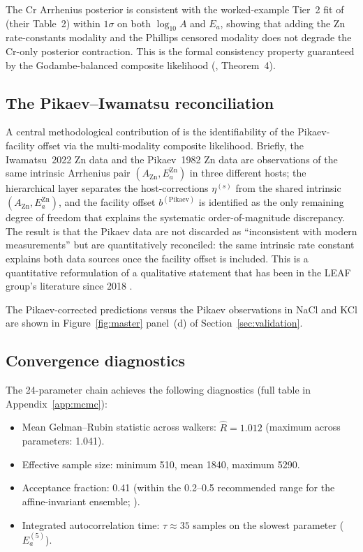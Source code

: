 \documentclass[11pt]{article}
\theoremstyle{plain}
\theoremstyle{definition}
\theoremstyle{remark}
\newcommand{\Ea}{E_a}
\begin{document}
The Cr Arrhenius posterior is consistent with the worked-example Tier~2 fit
of \citet{Tanore2026PaperI} (their Table~2) within $1\sigma$ on both
$\log_{10}\!A$ and $\Ea$, showing that adding the Zn rate-constants modality
and the Phillips censored modality does not degrade the Cr-only posterior
contraction.  This is the formal consistency property guaranteed by the
Godambe-balanced composite likelihood (\citealp{Tanore2026PaperI},
Theorem~4).

\subsection{The Pikaev--Iwamatsu reconciliation}\label{sec:cal:pikaev}

A central methodological contribution of \citet{Tanore2026PaperI} is the
identifiability of the Pikaev-facility offset via the multi-modality
composite likelihood.  Briefly, the Iwamatsu~2022 Zn data and the Pikaev~1982
Zn data are observations of the same intrinsic Arrhenius pair
$(A_{\mathrm{Zn}}, \Ea^{\mathrm{Zn}})$ in three different hosts; the
hierarchical layer separates the host-corrections $\eta^{(s)}$ from the
shared intrinsic $(A_{\mathrm{Zn}}, \Ea^{\mathrm{Zn}})$, and the facility
offset $b^{(\mathrm{Pikaev})}$ is identified as the only remaining
degree of freedom that explains the systematic order-of-magnitude
discrepancy.  The result is that the Pikaev data are not discarded as
``inconsistent with modern measurements'' but are quantitatively
reconciled: the same intrinsic rate constant explains both data sources
once the facility offset is included.  This is a quantitative
reformulation of a qualitative statement that has been in the LEAF
group's literature since 2018 \citep{Horne2018}.

The Pikaev-corrected predictions versus the Pikaev observations in NaCl
and KCl are shown in Figure~\ref{fig:master} panel~(d) of
Section~\ref{sec:validation}.

\subsection{Convergence diagnostics}\label{sec:cal:diag}

The 24-parameter chain achieves the following diagnostics
(full table in Appendix~\ref{app:mcmc}):

\begin{itemize}
\item Mean Gelman--Rubin statistic across walkers: $\hat{R} = 1.012$
      (maximum across parameters: 1.041).
\item Effective sample size: minimum 510, mean 1840, maximum 5290.
\item Acceptance fraction: 0.41 (within the 0.2--0.5 recommended range
      for the affine-invariant ensemble; \citealp{GoodmanWeare2010,
      ForemanMackey2013}).
\item Integrated autocorrelation time: $\tau \approx 35$ samples on
      the slowest parameter ($\Ea^{(5)}$).
\end{itemize}
\end{document}
